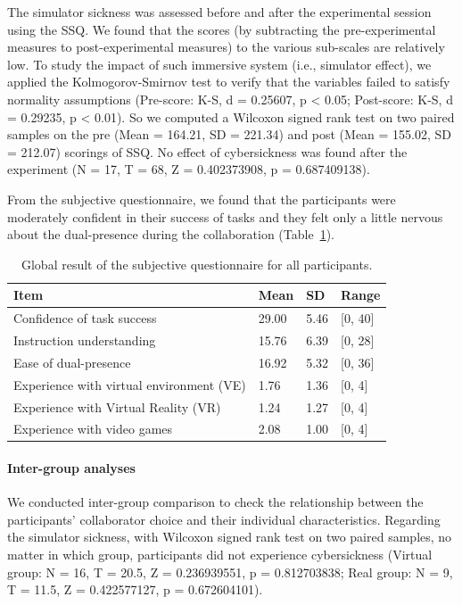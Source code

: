 The simulator sickness was assessed before and after the experimental session using the SSQ. We found that the scores (by subtracting the pre-experimental measures to post-experimental measures) to the various sub-scales are relatively low. To study the impact of such immersive system (i.e., simulator effect), we applied the Kolmogorov-Smirnov test to verify that the variables failed to satisfy normality assumptions (Pre-score: K-S, d = 0.25607, p \textless{} 0.05; Post-score: K-S, d = 0.29235, p \textless{} 0.01). So we computed a Wilcoxon signed rank test on two paired samples on the pre (Mean = 164.21, SD = 221.34) and post (Mean = 155.02, SD = 212.07) scorings of SSQ. No effect of cybersickness was found after the experiment (N = 17, T = 68, Z = 0.402373908, p = 0.687409138).

From the subjective questionnaire, we found that the participants were moderately confident in their success of tasks and they felt only a little nervous about the dual-presence during the collaboration (Table~\ref{tab:sub_qn}).

\begin{table}[!t]
\renewcommand{\arraystretch}{1.3}
\caption{Global result of the subjective questionnaire for all participants.}
\label{tab:sub_qn}
\centering
\begin{tabular}{l l l l}
	\hline
	Item & Mean & SD & Range \\ \hline
	Confidence of task success & 29.00 & 5.46 & [0, 40] \\
	Instruction understanding & 15.76 & 6.39 & [0, 28] \\
	Ease of dual-presence & 16.92 & 5.32 & [0, 36] \\
	Experience with virtual environment (VE) & 1.76 & 1.36 & [0, 4] \\
	Experience with Virtual Reality (VR) & 1.24 & 1.27 & [0, 4] \\
	Experience with video games & 2.08 & 1.00 & [0, 4] \\ \hline
\end{tabular}
\end{table}


\paragraph{Inter-group analyses}
We conducted inter-group comparison to check the relationship between the participants' collaborator choice and their individual characteristics. Regarding the simulator sickness, with Wilcoxon signed rank test on two paired samples, no matter in which group, participants did not experience cybersickness (Virtual group: N = 16, T = 20.5, Z = 0.236939551, p = 0.812703838; Real group: N = 9, T = 11.5, Z = 0.422577127, p = 0.672604101).


